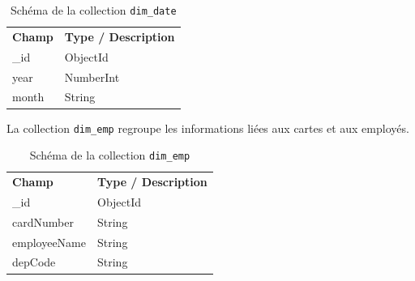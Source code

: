 \documentclass[a4paper,11pt]{report}
\begin{document}
\begin{table}[h!]
  \centering
  \renewcommand{\arraystretch}{1.2}
  \begin{tabular}{|l|l|}
    \hline
    \rowcolor{gray!20}
    \multicolumn{2}{|c|}{\textbf{Collection : dim\_date}}                 \\ \hline
    \textbf{Champ}         & \textbf{Type / Description}                                \\ \hline
    \_id                   & ObjectId                                                    \\ \hline
    year                   & NumberInt                                                   \\ \hline
    month                  & String                                                      \\ \hline
  \end{tabular}
  \caption{Schéma de la collection \texttt{dim\_date}}
\end{table}

\vspace{1em}
La collection \texttt{dim\_emp} regroupe les informations liées aux cartes et aux employés.

\begin{table}[h!]
  \centering
  \renewcommand{\arraystretch}{1.2}
  \begin{tabular}{|l|l|}
    \hline
    \rowcolor{gray!20}
    \multicolumn{2}{|c|}{\textbf{Collection : dim\_emp}}                  \\ \hline
    \textbf{Champ}         & \textbf{Type / Description}                                \\ \hline
    \_id                   & ObjectId                                                    \\ \hline
    cardNumber             & String                                                      \\ \hline
    employeeName           & String                                                      \\ \hline
    depCode                & String                                                      \\ \hline
  \end{tabular}
  \caption{Schéma de la collection \texttt{dim\_emp}}
\end{table}
\end{document}

